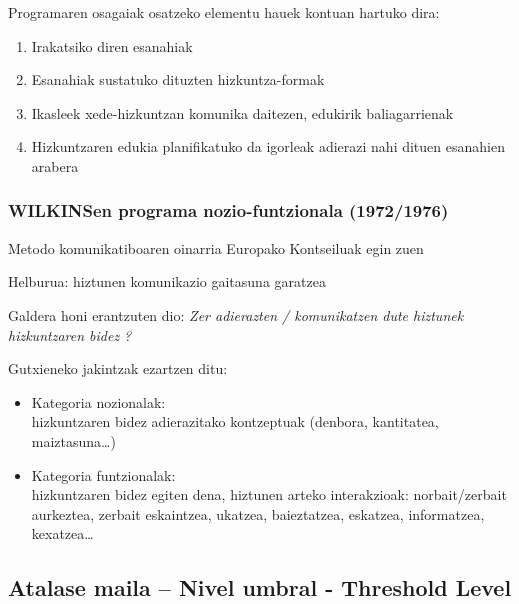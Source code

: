 \documentclass[
]{book}
\providecommand{\tightlist}{%
  \setlength{\itemsep}{0pt}\setlength{\parskip}{0pt}}
\begin{document}
Programaren osagaiak osatzeko elementu hauek kontuan hartuko dira:

\begin{enumerate}
\def\labelenumi{\arabic{enumi}.}
\tightlist
\item
  Irakatsiko diren esanahiak
\item
  Esanahiak sustatuko dituzten hizkuntza-formak
\item
  Ikasleek xede-hizkuntzan komunika daitezen, edukirik baliagarrienak
\item
  Hizkuntzaren edukia planifikatuko da igorleak adierazi nahi dituen esanahien arabera
\end{enumerate}

\hypertarget{wilkinsen-programa-nozio-funtzionala-19721976}{%
\subsubsection{WILKINSen programa nozio-funtzionala (1972/1976)}\label{wilkinsen-programa-nozio-funtzionala-19721976}}

Metodo komunikatiboaren oinarria Europako Kontseiluak egin zuen

Helburua: hiztunen komunikazio gaitasuna garatzea

Galdera honi erantzuten dio: \emph{Zer adierazten / komunikatzen dute hiztunek hizkuntzaren bidez ?}

Gutxieneko jakintzak ezartzen ditu:

\begin{itemize}
\tightlist
\item
  Kategoria nozionalak:\\
  hizkuntzaren bidez adierazitako kontzeptuak (denbora, kantitatea, maiztasuna\ldots)
\item
  Kategoria funtzionalak:\\
  hizkuntzaren bidez egiten dena, hiztunen arteko interakzioak: norbait/zerbait aurkeztea, zerbait eskaintzea, ukatzea, baieztatzea, eskatzea, informatzea, kexatzea\ldots{}
\end{itemize}

\hypertarget{atalase-maila-nivel-umbral---threshold-level}{%
\subsection{Atalase maila -- Nivel umbral - Threshold Level}\label{atalase-maila-nivel-umbral---threshold-level}}
\end{document}

